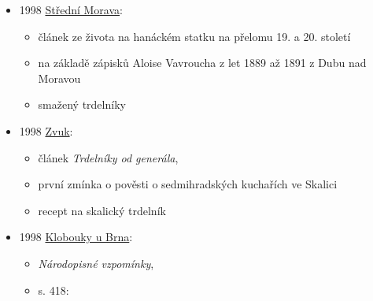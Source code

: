 \begin{itemize}
  \begin{itemize}
  \tightlist
  \item
    č. 1, s. 67
  \item
    \emph{Kapitoly z historie břeclavského muzejnictví}
  \item
    v roce 1933 dostalo muzeum darem od Fr. Mikeše a A. Holáskové
    dřevořezbu sv. Jana Nepomuckého, sochu asi ze starého břeclavského
    kostela, umělecké kování truhly, formu na trdelníky
  \end{itemize}
\item
  1998
  \href{https://ceskadigitalniknihovna.cz/view/uuid:955967f0-58cb-11e8-983f-005056827e51?page=uuid\%3A7daef930-7ef0-11e8-9588-5ef3fc9bb22f&fulltext=trdeln\%C3\%ADk\%20OR\%20trdeln\%C3\%ADky\%20OR\%20trdeln\%C3\%ADk\%C5\%AF&source=nkp}{Střední
  Morava}:

  \begin{itemize}
  \tightlist
  \item
    článek ze života na hanáckém statku na přelomu 19. a 20. století
  \item
    na základě zápisků Aloise Vavroucha z let 1889 až 1891 z Dubu nad
    Moravou
  \item
    smažený trdelníky
  \end{itemize}
\item
  1998
  \href{https://www.digitalniknihovna.cz/mzk/uuid/uuid:dd805301-5c91-11eb-94b4-5ef3fc9ae867}{Zvuk}:

  \begin{itemize}
  \tightlist
  \item
    článek \emph{Trdelníky od generála}, 
  \item
    první zmínka o pověsti o sedmihradských kuchařích ve Skalici
  \item
    recept na skalický trdelník
  \end{itemize}
\item
  1998
  \href{https://ceskadigitalniknihovna.cz/view/uuid:90c1d400-282b-11ed-9c80-005056827e51?page=uuid\%3Af40f9ec2-58d4-4e4a-b664-846a40f83308&source=nkp}{Klobouky
  u Brna}:

  \begin{itemize}
  \tightlist
  \item
    \emph{Národopisné vzpomínky}, 
  \item
    s. 418:


\end{itemize}
\end{itemize}
